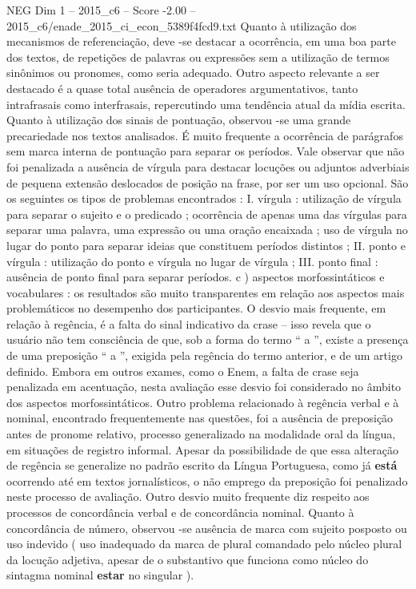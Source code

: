 \begin{textsample}{NEG Dim 1 – 2015\_c6 – Score -2.00 – 2015\_c6/enade\_2015\_ci\_econ\_5389f4fcd9.txt}
Quanto à utilização dos mecanismos de referenciação, deve -se destacar a ocorrência, em uma boa parte dos textos, de repetições de palavras ou expressões sem a utilização de termos sinônimos ou pronomes, como seria adequado.
Outro aspecto relevante a ser destacado é a quase total ausência de operadores argumentativos, tanto intrafrasais como interfrasais, repercutindo uma tendência atual da mídia escrita.
Quanto à utilização dos sinais de pontuação, observou -se uma grande precariedade nos textos analisados.
É muito frequente a ocorrência de parágrafos sem marca interna de pontuação para separar os períodos.
Vale observar que não foi penalizada a ausência de vírgula para destacar locuções ou adjuntos adverbiais de pequena extensão deslocados de posição na frase, por ser um uso opcional.
São os seguintes os tipos de problemas encontrados : I. vírgula : utilização de vírgula para separar o sujeito e o predicado ; ocorrência de apenas uma das vírgulas para separar uma palavra, uma expressão ou uma oração encaixada ; uso de vírgula no lugar do ponto para separar ideias que constituem períodos distintos ; II. ponto e vírgula : utilização do ponto e vírgula no lugar de vírgula ; III. ponto final : ausência de ponto final para separar períodos. c ) aspectos morfossintáticos e vocabulares : os resultados são muito transparentes em relação aos aspectos mais problemáticos no desempenho dos participantes.
O desvio mais frequente, em relação à regência, é a falta do sinal indicativo da crase – isso revela que o usuário não tem consciência de que, sob a forma do termo “ a ”, existe a presença de uma preposição “ a ”, exigida pela regência do termo anterior, e de um artigo definido.
Embora em outros exames, como o Enem, a falta de crase seja penalizada em acentuação, nesta avaliação esse desvio foi considerado no âmbito dos aspectos morfossintáticos.
Outro problema relacionado à regência verbal e à nominal, encontrado frequentemente nas questões, foi a ausência de preposição antes de pronome relativo, processo generalizado na modalidade oral da língua, em situações de registro informal.
Apesar da possibilidade de que essa alteração de regência se generalize no padrão escrito da Língua Portuguesa, como já \textbf{está} ocorrendo até em textos jornalísticos, o não emprego da preposição foi penalizado neste processo de avaliação.
Outro desvio muito frequente diz respeito aos processos de concordância verbal e de concordância nominal.
Quanto à concordância de número, observou -se ausência de marca com sujeito posposto ou uso indevido ( uso inadequado da marca de plural comandado pelo núcleo plural da locução adjetiva, apesar de o substantivo que funciona como núcleo do sintagma nominal \textbf{estar} no singular ).

\end{textsample}
